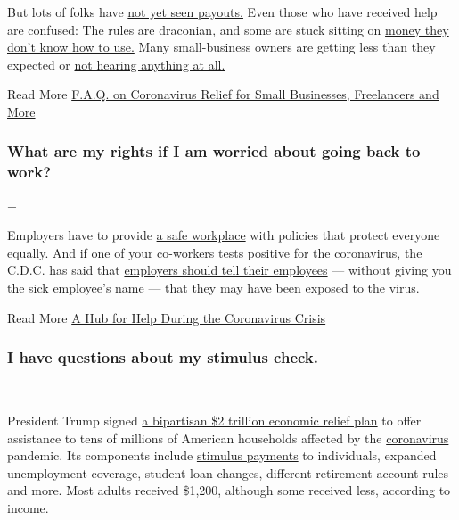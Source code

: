 But lots of folks have
\href{https://www.nytimes3xbfgragh.onion/interactive/2020/05/07/business/small-business-loans-coronavirus.html}{not
yet seen payouts.} Even those who have received help are confused: The
rules are draconian, and some are stuck sitting on
\href{https://www.nytimes3xbfgragh.onion/2020/05/02/business/economy/loans-coronavirus-small-business.html}{money
they don't know how to use.} Many small-business owners are getting less
than they expected or
\href{https://www.nytimes3xbfgragh.onion/2020/06/10/business/Small-business-loans-ppp.html}{not
hearing anything at all.}

 Read More
\href{https://www.nytimes3xbfgragh.onion/article/small-business-loans-stimulus-grants-freelancers-coronavirus.html}{F.A.Q.
on Coronavirus Relief for Small Businesses, Freelancers and More}

\hypertarget{what-are-my-rights-if-i-am-worried-about-going-back-to-work}{%
\subsubsection{What are my rights if I am worried about going back to
work?}\label{what-are-my-rights-if-i-am-worried-about-going-back-to-work}}

+

Employers have to provide
\href{https://www.osha.gov/SLTC/covid-19/standards.html}{a safe
workplace} with policies that protect everyone equally. And if one of
your co-workers tests positive for the coronavirus, the C.D.C. has said
that
\href{https://www.cdc.gov/coronavirus/2019-ncov/community/guidance-business-response.html}{employers
should tell their employees} --- without giving you the sick employee's
name --- that they may have been exposed to the virus.

 Read More
\href{https://www.nytimes3xbfgragh.onion/article/coronavirus-money-unemployment.html}{A
Hub for Help During the Coronavirus Crisis}

\hypertarget{i-have-questions-about-my-stimulus-check}{%
\subsubsection{I have questions about my stimulus
check.}\label{i-have-questions-about-my-stimulus-check}}

+

President Trump signed
\href{https://www.nytimes3xbfgragh.onion/2020/03/26/us/coronavirus-senate-stimulus-package.html}{a
bipartisan \$2 trillion economic relief plan} to offer assistance to
tens of millions of American households affected by the
\href{https://www.nytimes3xbfgragh.onion/2020/05/07/us/coronavirus-stimulus-package.html}{coronavirus}
pandemic. Its components include
\href{https://www.nytimes3xbfgragh.onion/2020/06/25/us/politics/coronavirus-stimulus-dead-people.html}{stimulus
payments} to individuals, expanded unemployment coverage, student loan
changes, different retirement account rules and more. Most adults
received \$1,200, although some received less, according to income.

